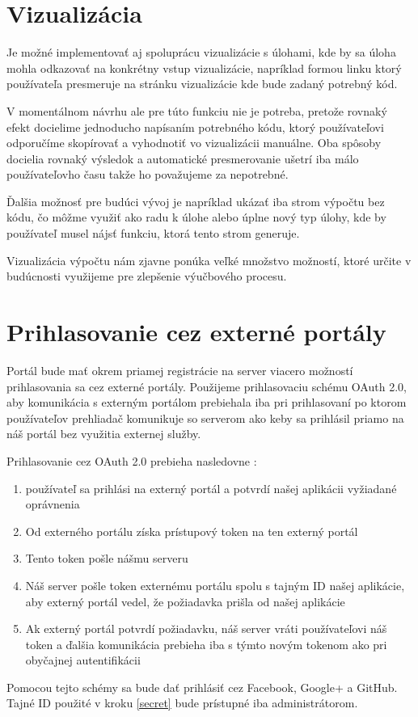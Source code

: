 \section{Vizualizácia}
Je možné implementovať aj spoluprácu vizualizácie s úlohami, kde by sa úloha mohla odkazovať
na konkrétny vstup vizualizácie, napríklad formou linku ktorý používateľa presmeruje
na stránku vizualizácie kde bude zadaný potrebný kód.

V momentálnom návrhu ale pre túto funkciu nie je potreba, pretože rovnaký efekt docielime
jednoducho napísaním potrebného kódu, ktorý používateľovi odporučíme skopírovať
a vyhodnotiť vo vizualizácii manuálne. Oba spôsoby docielia rovnaký výsledok a
automatické presmerovanie ušetrí iba málo používateľovho času takže ho považujeme
za nepotrebné.

Ďalšia možnosť pre budúci vývoj je napríklad ukázať iba strom výpočtu bez kódu, čo môžme
využiť ako radu k úlohe alebo úplne nový typ úlohy, kde by používateľ musel
nájsť funkciu, ktorá tento strom generuje.

Vizualizácia výpočtu nám zjavne ponúka veľké množstvo možností, ktoré určite v budúcnosti využijeme
pre zlepšenie výučbového procesu.

\section{Prihlasovanie cez externé portály}
\label{oAuth}
Portál bude mať okrem priamej registrácie na server viacero možností prihlasovania sa cez externé portály.
Použijeme prihlasovaciu schému OAuth 2.0, aby komunikácia s externým
portálom prebiehala iba pri prihlasovaní po ktorom používateľov prehliadač
komunikuje so serverom ako keby sa prihlásil priamo na náš portál bez využitia externej služby.

Prihlasovanie cez OAuth 2.0 prebieha nasledovne \cite{FBlogin}:
\begin{enumerate}
\item{používateľ sa prihlási na externý portál a potvrdí našej aplikácii vyžiadané oprávnenia}
\item{Od externého portálu získa prístupový token na ten externý portál}
\item \label{secret}{Tento token pošle nášmu serveru}
\item{Náš server pošle token externému portálu spolu s tajným ID našej aplikácie, aby externý portál vedel, že požiadavka prišla od našej aplikácie}
\item{Ak externý portál potvrdí požiadavku, náš server vráti používateľovi náš token a
    ďalšia komunikácia prebieha iba s týmto novým tokenom ako pri obyčajnej autentifikácii}
\end{enumerate}

Pomocou tejto schémy sa bude dať prihlásiť cez Facebook, Google+ a GitHub.
\newline
Tajné ID použité v kroku \ref{secret} bude prístupné iba administrátorom.
